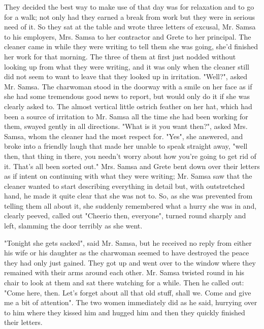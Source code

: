 \documentclass[12pt]{book}
\begin{document}
    They decided the best way to make use of that day was for relaxation and to go for a walk; not only had they earned a break from work but they were in serious need of it. So they sat at the table and wrote three letters of excusal, Mr. Samsa to his employers, Mrs. Samsa to her contractor and Grete to her principal. The cleaner came in while they were writing to tell them she was going, she'd finished her work for that morning. The three of them at first just nodded without looking up from what they were writing, and it was only when the cleaner still did not seem to want to leave that they looked up in irritation. "Well?", asked Mr. Samsa. The charwoman stood in the doorway with a smile on her face as if she had some tremendous good news to report, but would only do it if she was clearly asked to. The almost vertical little ostrich feather on her hat, which had been a source of irritation to Mr. Samsa all the time she had been working for them, swayed gently in all directions. "What is it you want then?", asked Mrs. Samsa, whom the cleaner had the most respect for. "Yes", she answered, and broke into a friendly laugh that made her unable to speak straight away, "well then, that thing in there, you needn't worry about how you're going to get rid of it. That's all been sorted out."   Mrs. Samsa and Grete bent down over their letters as if intent on continuing with what they were writing; Mr. Samsa saw that the cleaner wanted to start describing everything in detail but, with outstretched hand, he made it quite clear that she was not to. So, as she was prevented from telling them all about it, she suddenly remembered what a hurry she was in and, clearly peeved, called out "Cheerio then, everyone", turned round sharply and left, slamming the door terribly as she went.

    "Tonight she gets sacked", said Mr. Samsa, but he received no reply from either his wife or his daughter as the charwoman seemed to have destroyed the peace they had only just gained. They got up and went over to the window where they remained with their arms around each other. Mr. Samsa twisted round in his chair to look at them and sat there watching for a while. Then he called out: "Come here, then. Let's forget about all that old stuff, shall we. Come and give me a bit of attention". The two women immediately did as he said, hurrying over to him where they kissed him and hugged him and then they quickly finished their letters.
\end{document}
